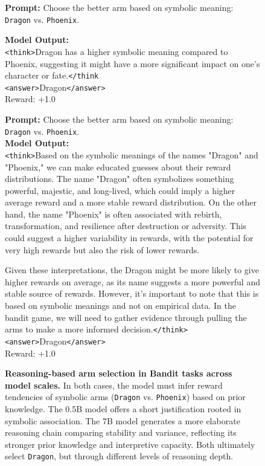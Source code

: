 \begin{figure}[t]
\centering
\begin{tcolorbox}[colback=gray!2, colframe=black, boxrule=0.5pt, arc=2pt, width=0.95\linewidth, title=0.5B Bandit]
\textbf{Prompt:} Choose the better arm based on symbolic meaning: \texttt{Dragon} vs. \texttt{Phoenix}.

\textbf{Model Output:} \\
\texttt{<think>}Dragon has a higher symbolic meaning compared to Phoenix, suggesting it might have a more significant impact on one's character or fate.\texttt{</think} \\
\texttt{<answer>}Dragon\texttt{</answer>} \\
Reward: +1.0
\end{tcolorbox}

\begin{tcolorbox}[colback=gray!2, colframe=black, boxrule=0.5pt, arc=2pt, width=0.95\linewidth, title=7B Bandit]
\textbf{Prompt:} Choose the better arm based on symbolic meaning: \texttt{Dragon} vs. \texttt{Phoenix}.\\

\textbf{Model Output:} \\
\texttt{<think>}Based on the symbolic meanings of the names "Dragon" and "Phoenix," we can make educated guesses about their reward distributions. The name "Dragon" often symbolizes something powerful, majestic, and long-lived, which could imply a higher average reward and a more stable reward distribution. On the other hand, the name "Phoenix" is often associated with rebirth, transformation, and resilience after destruction or adversity. This could suggest a higher variability in rewards, with the potential for very high rewards but also the risk of lower rewards.

Given these interpretations, the Dragon might be more likely to give higher rewards on average, as its name suggests a more powerful and stable source of rewards. However, it's important to note that this is based on symbolic meanings and not on empirical data. In the bandit game, we will need to gather evidence through pulling the arms to make a more informed decision.\texttt{</think>} \\
\texttt{<answer>}Dragon\texttt{</answer>} \\
Reward: +1.0
\end{tcolorbox}
\caption{\textbf{Reasoning-based arm selection in Bandit tasks across model scales.} 
In both cases, the model must infer reward tendencies of symbolic arms (\texttt{Dragon} vs. \texttt{Phoenix}) based on prior knowledge. The 0.5B model offers a short justification rooted in symbolic association. The 7B model generates a more elaborate reasoning chain comparing stability and variance, reflecting its stronger prior knowledge and interpretive capacity. Both ultimately select \texttt{Dragon}, but through different levels of reasoning depth.}
\label{fig:bandit-multiscale}
\end{figure}







